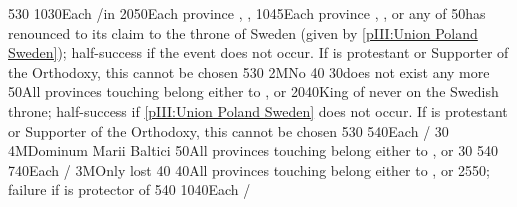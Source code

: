 %
 
%
%
{5}{30}{\EU@objBaltiqueTrade}%
%
%
%
{10}{30}{Each \COL/\TP in }%
%
%
{20}{50}{Each province \provinceNeva, \provinceLivonija, \provinceEstland}%
%
%
{10}{45}{Each province \provinceSkane, \provinceVastergotland,
  \provinceGotland or any of \regionNorvege}%
%
%
{}{50}{\POL has renounced to its claim to the throne of Sweden (given by
  \ref{pIII:Union Poland Sweden}); half-success if the event does not
  occur. If \POL is protestant or Supporter of the Orthodoxy, this cannot be
  chosen}%
%
%
%
{5}{30}{\EU@objBaltiqueTrade}%
%
\EUobjective2M{No }{}%
{}{40}{}%
%
%
{}{30}{\payshanse does not exist any more}%
%
%
{}{50}{All provinces touching \regionBaltique belong either to \SUE,
  \paysbrandebourg or \paysdanemark}%
%
%
{20}{40}{King of  never on the Swedish throne;
  half-success if \ref{pIII:Union Poland Sweden} does not occur. If \POL is
  protestant or Supporter of the Orthodoxy, this cannot be chosen}%
%
%
%
{5}{30}{\EU@objBaltiqueTrade}%
%
%
{5}{40}{Each \COL/\TP}%
%
%
{}{30}{}%
%
\EUobjective4M{Dominum Marii Baltici}{}%
{}{50}{All provinces touching \regionBaltique belong either to \SUE,
  \paysbrandebourg or \paysdanemark}%
%
%
{}{30}{}%
%
%
%
{5}{40}{\EU@objBaltiqueTrade}%
%
%
{7}{40}{Each \COL/\TP}%
%
\EUobjective3M{Only \provinceNeva lost}{}%
{}{40}{}%
%
%
{}{40}{All provinces touching \regionBaltique belong either to \SUE,
  \paysbrandebourg or \paysdanemark}%
%
%
{25}{50}{\EU@objPOLVictory; failure if \paysmajeurFrance is protector of
  \paysPologne}%
%
%
%
{5}{40}{\EU@objBaltiqueTrade}%
%
%
{10}{40}{Each \COL/\TP}%

